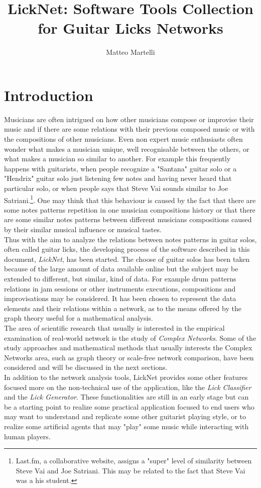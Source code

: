 \documentclass{llncs}
\title{LickNet: Software Tools Collection for Guitar Licks Networks}
\author{Matteo Martelli}
\institute{
	University of Bologna\\ 
	\email{matteo.martelli9@studio.unibo.it}
}
\begin{document}
\maketitle

\begin{abstract}
\end{abstract}
\section{Introduction}
Musicians are often intrigued on how other musicians compose or
improvise their music and if there are some relations with their
previous composed music or with the compositions of other musicians.
Even non expert music enthusiasts often wonder what makes a 
musician unique, well recognisable between the others, or what makes a
musician so similar to another. For example
this frequently happens with guitarists, when people recognize 
a "Santana" guitar solo or a "Hendrix" guitar solo just listening 
 few notes and having never heard that particular solo, or when people
says that Steve Vai sounds similar to Joe Satriani.\footnote{Last.fm, a
collaborative website, assigns a "super" level of similarity between Steve Vai
and Joe Satriani. This may be related to the fact that Steve Vai was a
his student.}.
One may think that this behaviour is caused by the fact that there are
some notes patterns
repetition in one musician compositions history or that there are some
similar notes patterns between different musicians compositions caused
by their similar musical influence or musical tastes.\\
Thus with the aim to analyze
the relations between notes patterns in guitar
solos, often called guitar licks, the developing process of the software 
described in this
document, \emph{LickNet}, has been started. The choose of guitar solos has been taken 
because of the large amount of data available online but the subject may 
be extended to
different, but similar, kind of data. For example drum patterns
relations in jam sessions or other instruments executions, compositions
and improvisations may be considered. It has been chosen to represent
the data elements and their relations within a network, as to the
means offered by the graph theory useful for a mathematical analysis.\\
The area of scientific research
that usually is interested in the empirical examination of real-world network
 is the study of \emph{Complex Networks}. Some of the study approaches
and mathematical methods that usually interests the Complex Networks
area, such as graph theory or scale-free network
comparison\cite{complex-networks}, 
have been considered and will be discussed in the next sections.\\
In addition to the network analysis tools, LickNet provides some other
features focused more on the non-technical use of the application, like
the \emph{Lick Classifier} and the \emph{Lick Generator}. These
functionalities are still in an early stage but can be a starting point
to realize some practical application focused to end users who may want to
understand and replicate some other guitarist playing style, or to
realize some artificial agents that may "play" some music while interacting
with human players.
\end{document}
